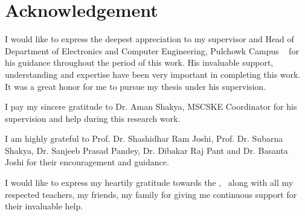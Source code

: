 \chapter*{Acknowledgement}


I would like to express the deepest appreciation to my supervisor and Head of Department of Electronics and Computer Engineering, Pulchowk Campus \myadvisorA~ for his guidance throughout the period of this work. His invaluable support, understanding and expertise have been very important in completing this work. It was a great honor for me to pursue my thesis under his supervision.

I pay my sincere gratitude to Dr. Aman Shakya, MSCSKE Coordinator for his supervision and help during this research work.

I am highly grateful to Prof. Dr. Shashidhar Ram Joshi, Prof. Dr. Subarna Shakya, Dr. Sanjeeb Prasad Pandey, Dr. Dibakar Raj Pant and Dr. Basanta Joshi for their encouragement and guidance.

I would like to express my heartily gratitude towards the \myinstitute, \mycampus ~along with all my respected teachers, my friends, my family for giving me continuous support for their invaluable help.


{\bf{\theauthor}}


{\bf{\roll}}


{\bf{\myinstitute}}


